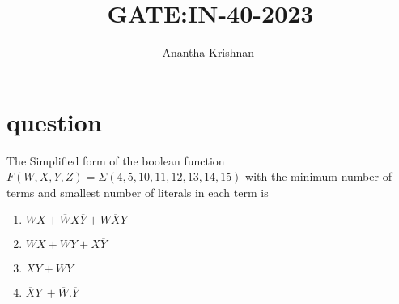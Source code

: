 \documentclass[journal,12pt,onecolumn]{IEEEtran}
\theoremstyle{remark}
\begin{document}

\vspace{3cm}

\title{GATE:IN-40-2023}
\author{Anantha Krishnan $^{}$%
}
\maketitle
\bigskip



\section{question}
The Simplified form of the boolean function $F(W,X,Y,Z)=\Sigma (4,5,10,11,12,13,14,15)$ with the minimum number of terms and smallest number of literals in each term is
\begin{enumerate}
    \item  $WX + \overline{W}X\overline{Y} + W\overline{X}Y$ 
    \item  $WX + WY + X\overline{Y}$ 
    \item  $X\overline{Y} + WY$ 
    \item  $\overline{X}Y\ + \overline{W}.\overline{Y}$ 
\end{enumerate}
 
\end{document}

